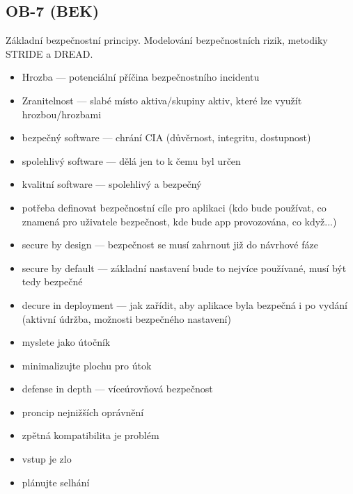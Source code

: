 \subsection{OB-7 (BEK)}
Základní bezpečnostní principy. Modelování bezpečnostních rizik, metodiky STRIDE a DREAD.

\begin{itemize}
    \item Hrozba --- potenciální příčina bezpečnostního incidentu
    \item Zranitelnost --- slabé místo aktiva/skupiny aktiv, které lze využít hrozbou/hrozbami
    \item bezpečný software --- chrání CIA (důvěrnost, integritu, dostupnost)
    \item spolehlivý software --- dělá jen to k čemu byl určen
    \item kvalitní software --- spolehlivý a bezpečný
    \item potřeba definovat bezpečnostní cíle pro aplikaci (kdo bude používat, co znamená pro uživatele bezpečnost, kde bude app provozována, co když...)
    \item secure by design --- bezpečnost se musí zahrnout již do návrhové fáze
    \item secure by default --- základní nastavení bude to nejvíce používané, musí být tedy bezpečné
    \item decure in deployment --- jak zařídit, aby aplikace byla bezpečná i po vydání (aktivní údržba, možnosti bezpečného nastavení)
    \item myslete jako útočník 
    \item minimalizujte plochu pro útok
    \item defense in depth --- víceúrovňová bezpečnost
    \item proncip nejnižších oprávnění
    \item zpětná kompatibilita je problém
    \item vstup je zlo
    \item plánujte selhání
\end{itemize}

